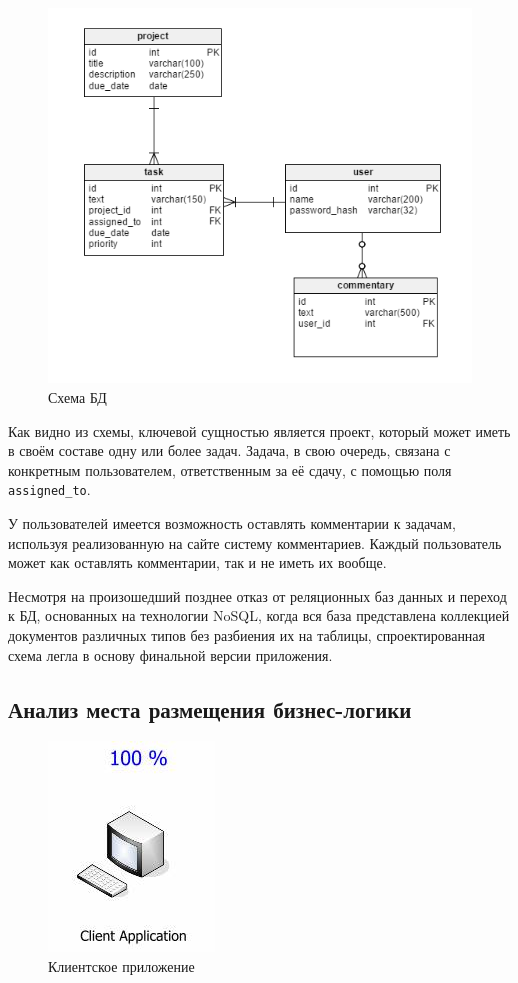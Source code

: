 \documentclass[a4paper, 14pt]{extarticle}
\begin{document}
\begin{figure}[!htb]
  \centering
    \includegraphics[scale=0.6]{../shared_images/schema.png}
   \caption{Схема БД}
    \label{fig:start}
\end{figure}

Как видно из схемы, ключевой сущностью является проект, который может иметь в своём составе одну или более задач. Задача, в свою очередь, связана с конкретным пользователем, ответственным за её сдачу, с помощью поля {\tt assigned\_to}.

У пользователей имеется возможность оставлять комментарии к задачам, используя реализованную на сайте систему комментариев. Каждый пользователь может как оставлять комментарии, так и не иметь их вообще.

Несмотря на произошедший позднее отказ от реляционных баз данных и переход к БД, основанных на технологии NoSQL, когда вся база представлена коллекцией документов различных типов без разбиения их на таблицы, спроектированная схема легла в основу финальной версии приложения.

\subsection{Анализ места размещения бизнес-логики}
\begin{figure}[!htb]
  \centering
    \includegraphics[scale=0.6]{../shared_images/business-logic/client.jpg}
   \caption{Клиентское приложение}
    \label{fig:start}
\end{figure}
\end{document}
